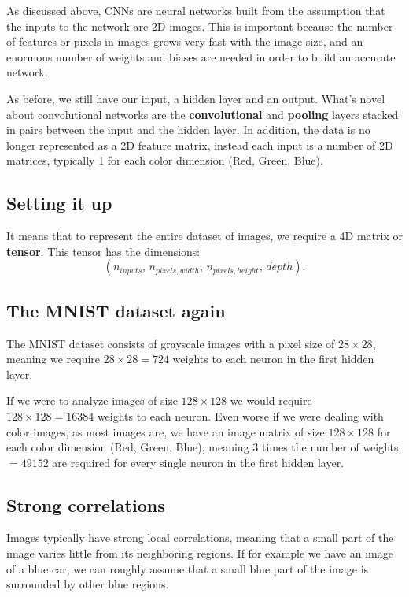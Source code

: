 \documentclass[%
oneside,                 %
final,                   %
10pt]{article}
\begin{document}
As discussed above, CNNs are neural networks built from the assumption that the inputs
to the network are 2D images. This is important because the number of features or pixels in images
grows very fast with the image size, and an enormous number of weights and biases are needed in order to build an accurate network.  

As before, we still have our input, a hidden layer and an output. What's novel about convolutional networks
are the \textbf{convolutional} and \textbf{pooling} layers stacked in pairs between the input and the hidden layer.
In addition, the data is no longer represented as a 2D feature matrix, instead each input is a number of 2D
matrices, typically 1 for each color dimension (Red, Green, Blue). 


\subsection{Setting it up}

It means that to represent the entire
dataset of images, we require a 4D matrix or \textbf{tensor}. This tensor has the dimensions:  
\[  
(n_{inputs},\, n_{pixels, width},\, n_{pixels, height},\, depth) .
\]

\subsection{The MNIST dataset again}

The MNIST dataset consists of grayscale images with a pixel size of
$28\times 28$, meaning we require $28 \times 28 = 724$ weights to each
neuron in the first hidden layer.

If we were to analyze images of size $128\times 128$ we would require
$128 \times 128 = 16384$ weights to each neuron. Even worse if we were
dealing with color images, as most images are, we have an image matrix
of size $128\times 128$ for each color dimension (Red, Green, Blue),
meaning 3 times the number of weights $= 49152$ are required for every
single neuron in the first hidden layer.


\subsection{Strong correlations}
Images typically have strong local correlations, meaning that a small
part of the image varies little from its neighboring regions. If for
example we have an image of a blue car, we can roughly assume that a
small blue part of the image is surrounded by other blue regions.
\end{document}
